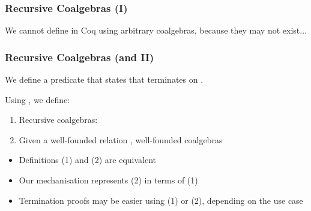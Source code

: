 \begin{frame}[fragile]
  \frametitle{Recursive Coalgebras (I)}

  We cannot define  in Coq using arbitrary coalgebras, because they may not exist...

  \vspace{.6cm}

\end{frame}

\begin{frame}
  \frametitle{Recursive Coalgebras (and II)}

  We define a predicate  that states that 
terminates on .
     \vspace{.4cm}

  Using , we define:
    \begin{enumerate}
      \item Recursive coalgebras:


      \item Given a well-founded relation , well-founded coalgebras

     \end{enumerate}
     \vspace{.4cm}

    \begin{itemize}
    \item<2-> Definitions (1) and (2) are equivalent
    \item<3-> Our mechanisation represents (2) in terms of (1)
    \item<4-> Termination proofs may be easier using (1) or (2), depending on the
use case
    \end{itemize}
\end{frame}

